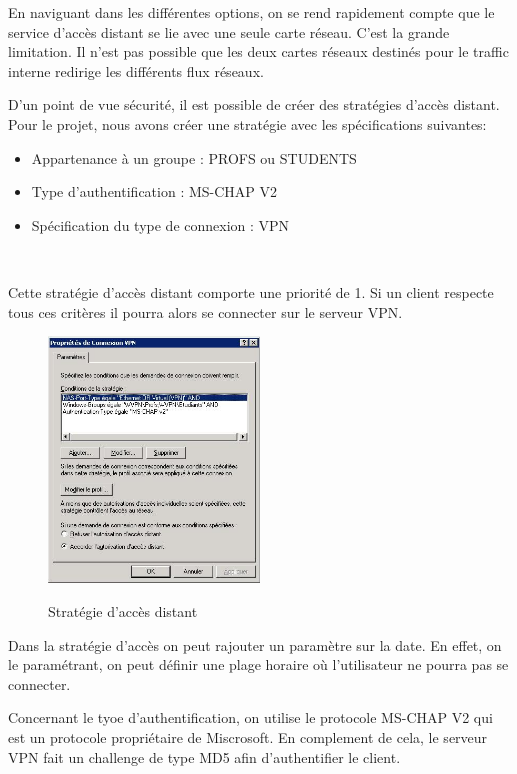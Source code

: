 En naviguant dans les différentes options, on se rend rapidement compte que le service d'accès distant se lie avec une seule carte réseau. C'est la grande limitation. Il n'est pas possible que les deux cartes réseaux destinés pour le traffic interne redirige les différents flux réseaux.

D'un point de vue sécurité, il est possible de créer des stratégies d'accès distant. Pour le projet, nous avons créer une stratégie avec les spécifications suivantes:
~\
\begin{itemize}
 	\item Appartenance à un groupe : PROFS ou STUDENTS
	\item Type d'authentification : MS-CHAP V2
	\item Spécification du type de connexion : VPN
\end{itemize}
~


Cette stratégie d'accès distant comporte une priorité de 1. Si un client respecte tous ces critères il pourra alors se connecter sur le serveur VPN.

\begin{figure}[H]
	\begin{center}
		\includegraphics[width=0.50\textwidth]{partie_2/screen_windows/strat.png}\\
	\end{center}
	\caption{Stratégie d'accès distant}
	\label{VPN_STRAT}
\end{figure}

Dans la stratégie d'accès on peut rajouter un paramètre sur la date. En effet, on le paramétrant, on peut définir une plage horaire où l'utilisateur ne pourra pas se connecter.

Concernant le tyoe d'authentification, on utilise le protocole MS-CHAP V2 qui est un protocole propriétaire de Miscrosoft. En complement de cela, le serveur VPN fait un challenge de type MD5 afin d'authentifier le client.

